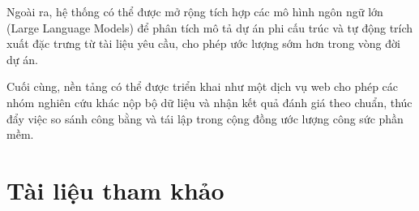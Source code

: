 \documentclass[12pt,a4paper]{article}
\begin{document}
Ngoài ra, hệ thống có thể được mở rộng tích hợp các mô hình ngôn ngữ lớn (Large Language Models) để phân tích mô tả dự án phi cấu trúc và tự động trích xuất đặc trưng từ tài liệu yêu cầu, cho phép ước lượng sớm hơn trong vòng đời dự án.

Cuối cùng, nền tảng có thể được triển khai như một dịch vụ web cho phép các nhóm nghiên cứu khác nộp bộ dữ liệu và nhận kết quả đánh giá theo chuẩn, thúc đẩy việc so sánh công bằng và tái lập trong cộng đồng ước lượng công sức phần mềm.

\section*{Tài liệu tham khảo}
\end{document}
